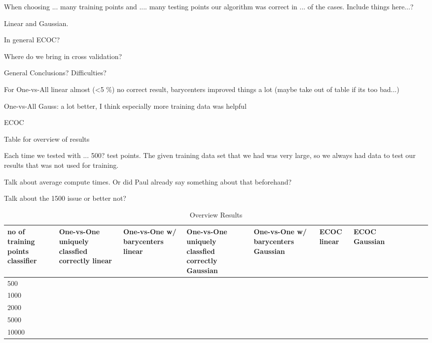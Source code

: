 When choosing ... many training points and .... many testing points our algorithm was correct in ... of the cases. Include things here...?


Linear and Gaussian.

In general ECOC?

Where do we bring in cross validation?

General Conclusions? Difficulties?

For One-vs-All linear almost (<5 \%) no correct result, barycenters improved things a lot  (maybe take out of table if its too bad...)

One-vs-All Gauss: a lot better, I think especially more training data was helpful

ECOC 

Table for overview of results 

Each time we tested with ... 500? test points. The given training data set that we had was very large, so we always had data to test our results that was not used for training. 

Talk about average compute times. Or did Paul already say something about that beforehand? 

Talk about the 1500 issue or better not?


\begin{table}[ht!]
	\centering
	\caption{Overview Results}
	\begin{tabular}{|l|l|l|l|l|l|l|l|l|l|l|l|} \hline
\multicolumn{1}{|p{2cm}|}{no of training points classifier} & \multicolumn{1}{p{2cm}|}{One-vs-One uniquely classfied correctly linear} & \multicolumn{1}{p{2cm}|}{One-vs-One w/ barycenters linear} & \multicolumn{1}{p{2cm}|}{One-vs-One uniquely classfied correctly Gaussian} &  \multicolumn{1}{p{2cm}|}{One-vs-One w/ barycenters Gaussian} & \multicolumn{1}{p{2cm}|}{ECOC linear} & \multicolumn{1}{p{2cm}|}{ECOC Gaussian} \\ \hline \hline
	500	&  &  &  &  &  &  \\ \hline
	1000	&  &  &  &  &  &  \\ \hline
	2000	&  &  &  &  &  &  \\ \hline
	5000	&  &  &  &  &  &  \\ \hline
	10000	&  &  &  &  &  &  \\ \hline
	\end{tabular}
\end{table}

